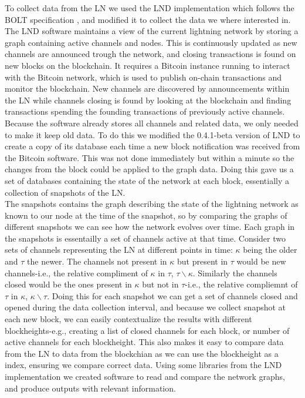 To collect data from the LN we used the LND implementation \cite{lnd} which follows the BOLT specification \cite{bolt}, and modified it to collect the data we where interested in. The LND software maintains a view of the current lightning network by storing a graph containing active channels and nodes. This is continuously updated as new channels are announced trough the network, and closing transactions is found on new blocks on the blockchain. It requires a Bitcoin instance running to interact with the Bitcoin network, which is used to publish on-chain transactions and monitor the blockchain. New channels are discovered by announcements within the LN while channels closing is found by looking at the blockchain and finding transactions spending the founding transactions of previously active channels. 
Because the software already stores all channels and related data, we only needed to make it keep old data.
To do this we modified the 0.4.1-beta version of LND to create a copy of its database each time a new block notification was received from the Bitcoin software. This was not done immediately but within a minute so the changes from the block could be applied to the graph data. Doing this gave us a set of databases containing the state of the network at each block, essentially a collection of snapshots of the LN.
\\

The snapshots contains the graph describing the state of the lightning network as known to our node at the time of the snapshot, so by comparing the graphs of different snapshots we can see how the network evolves over time. 
Each graph in the snapshots is essentailly a set of channels active at that time. Consider two sets of channels representing the LN at different points in time: \(\kappa\) being the older and \(\tau\) the newer. The channels not present in \(\kappa\) but present in \(\tau\) would be new channels-i.e., the relative compliment of \(\kappa\) in \(\tau\), \( \tau \backslash{}\kappa\). Similarly the channels closed would be the ones present in \(\kappa\) but not in \(\tau\)-i.e., the relative compliemnt of \(\tau\) in \(\kappa\), \(\kappa\backslash{}\tau\). Doing this for each snapshot we can get a set of channels closed and opened during the data collection interval, and because we collect snapshot at each new block, we can easily contextualize the results with different blockheights-e.g., creating a list of closed channels for each block, or number of active channels for each blockheight. This also makes it easy to compare data from the LN to data from the blockchian as we can use the blockheight as a index, ensuring we compare correct data.
Using some libraries from the LND implementation we created software to read and compare the network graphs, and produce outputs with relevant information.
\\


